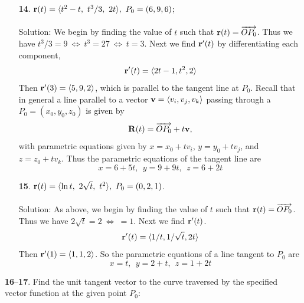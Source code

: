 \documentclass[12pt]{amsbook}
\newcommand{\la}{\langle}
\newcommand{\ra}{\rangle}
\begin{document}
\begin{enumerate}
  \item[{\small\bf 14}.] ${\bf r}(t)=\la t^2-t,\ t^3/3,\ 2t\ra, \ P_0=(6,9,6)$;
  \\
  \\
  {\sc Solution}: We begin by finding the value of $t$ such that ${\bf r}(t)=\overrightarrow{OP_0}$. Thus we have $t^3/3=9 \ \Leftrightarrow \ t^3=27 \ \Leftrightarrow \ t=3$. Next we find ${\bf r}'(t)$ by differentiating each component,
  $${\bf r}'(t)=\la 2t-1,t^2,2 \ra$$
  Then ${\bf r}'(3)=\la 5,9,2 \ra$, which is parallel to the tangent line at $P_0$. Recall that in general a line parallel to a vector ${\bf v}=\la v_i, v_j, v_k\ra$ passing through a $P_0=(x_0,y_0,z_0)$ is given by
  $${\bf R}(t)=\overrightarrow{OP_0}+t{\bf v},$$
  with parametric equations given by $x=x_0+tv_i$, $y=y_0+tv_j$, and $z=z_0+tv_k$. Thus the parametric equations of the tangent line are
  $$x=6+5t, \ \ y=9+9t, \ \ z=6+2t$$
  \item[{\small\bf 15}.] ${\bf r}(t)=\la \ln t,\ 2\sqrt{t},\ t^2\ra, \ P_0=(0,2,1)$.
  \\
  \\
  {\sc Solution}: As above, we begin by finding the value of $t$ such that ${\bf r}(t)=\overrightarrow{OP_0}$. Thus we have $2\sqrt{t}=2 \ \Leftrightarrow \ =1$. Next we find ${\bf r}'(t)$.
  $${\bf r}'(t)=\la 1/t, 1/\sqrt{t}, 2t\ra$$
  Then ${\bf r}'(1)=\la 1,1,2 \ra$. So the parametric equations of a line tangent to $P_0$ are
  $$x=t, \ \ y=2+t, \ \ z=1+2t$$
\end{enumerate}
\noindent
{\small {\bf 16}--{\bf 17}}. Find the unit tangent vector to the curve traversed by the specified
vector function at the given point $P_0$:
\end{document}

